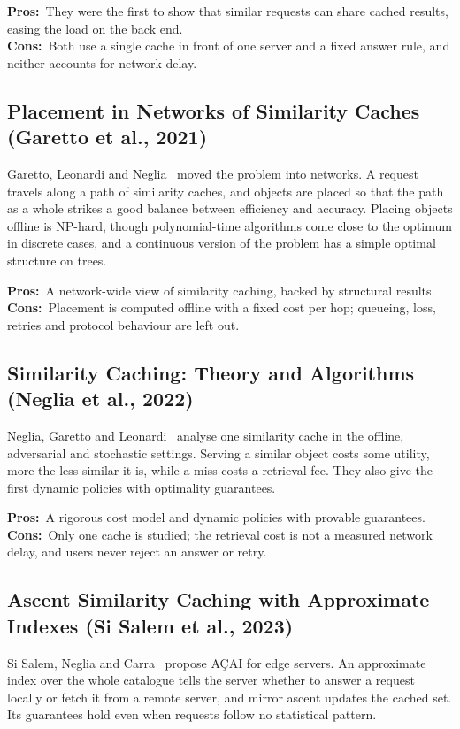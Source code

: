 \documentclass[11pt,a4paper]{article}
\newcommand{\pros}{\textcolor{green!50!black}{\textbf{Pros:}}~}
\newcommand{\cons}{\textcolor{red!70!black}{\textbf{Cons:}}~}
\begin{document}
\pros They were the first to show that similar requests can share cached results, easing the load on
the back end.\\
\cons Both use a single cache in front of one server and a fixed answer rule, and neither accounts
for network delay.

\subsection{Placement in Networks of Similarity Caches (Garetto et al., 2021)}
Garetto, Leonardi and Neglia~\cite{garetto2021placement} moved the problem into networks. A request
travels along a path of similarity caches, and objects are placed so that the path as a whole strikes
a good balance between efficiency and accuracy. Placing objects offline is NP-hard, though
polynomial-time algorithms come close to the optimum in discrete cases, and a continuous version of
the problem has a simple optimal structure on trees.

\pros A network-wide view of similarity caching, backed by structural results.\\
\cons Placement is computed offline with a fixed cost per hop; queueing, loss, retries and protocol
behaviour are left out.

\subsection{Similarity Caching: Theory and Algorithms (Neglia et al., 2022)}
Neglia, Garetto and Leonardi~\cite{neglia2022similarity} analyse one similarity cache in the offline,
adversarial and stochastic settings. Serving a similar object costs some utility, more the less
similar it is, while a miss costs a retrieval fee. They also give the first dynamic policies with
optimality guarantees.

\pros A rigorous cost model and dynamic policies with provable guarantees.\\
\cons Only one cache is studied; the retrieval cost is not a measured network delay, and users never
reject an answer or retry.

\subsection{Ascent Similarity Caching with Approximate Indexes (Si Salem et al., 2023)}
Si Salem, Neglia and Carra~\cite{sisalem2023acai} propose A\c{C}AI for edge servers. An approximate
index over the whole catalogue tells the server whether to answer a request locally or fetch it from
a remote server, and mirror ascent updates the cached set. Its guarantees hold even when requests
follow no statistical pattern.
\end{document}
